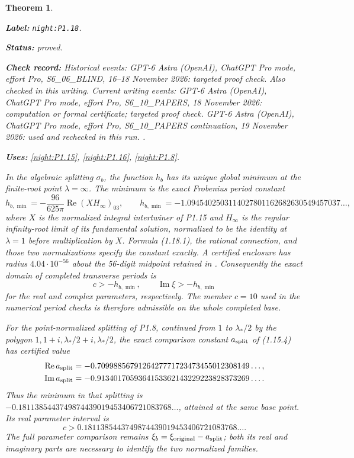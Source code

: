 \documentclass[11pt,a4paper]{article}
\newtheorem{theorem}{Theorem}[section]
\theoremstyle{definition}
\newcommand{\StatementRecord}[4]{\par\smallskip\begingroup\upshape\raggedright\noindent\textbf{Label:} \nolinkurl{#1}.\par\noindent\textbf{Status:} #2.\par\noindent\textbf{Check record:} #3.\par\noindent\textbf{Uses:} #4.\par\endgroup\smallskip}
\begin{document}
\begin{theorem}\label{night:P1.18}
\StatementRecord{night:P1.18}{proved}{Historical events: GPT-6 Astra (OpenAI), ChatGPT Pro mode, effort Pro, S6\_06\_BLIND, 16--18 November 2026: targeted proof check. Also checked in this writing. Current writing events: GPT-6 Astra (OpenAI), ChatGPT Pro mode, effort Pro, S6\_10\_PAPERS, 18 November 2026: computation or formal certificate; targeted proof check. GPT-6 Astra (OpenAI), ChatGPT Pro mode, effort Pro, S6\_10\_PAPERS continuation, 19 November 2026: used and rechecked in this run. }{\cref{night:P1.15}, \cref{night:P1.16}, \cref{night:P1.8}}
In the algebraic splitting $\sigma_b$, the function $h_b$ has its
unique global minimum at the finite-root point $\lambda=\infty$.
The minimum is the exact Frobenius period constant
\[
 h_{b,\min}=-\frac{96}{625\pi}\operatorname{Re}(XH_\infty)_{03},
 \qquad
 h_{b,\min}=-1.0945402503114027801162682630549457037\ldots,
\tag{1.18.1}
\]
where $X$ is the normalized integral intertwiner of P1.15 and
$H_\infty$ is the regular infinity-root limit of its fundamental
solution, normalized to be the identity at $\lambda=1$ before
multiplication by $X$.  Formula (1.18.1), the rational connection,
and those two normalizations specify the constant exactly.
A certified enclosure has radius $4.04\cdot10^{-56}$ about the
56-digit midpoint retained in
.
Consequently the exact domain of completed transverse periods is
\[
 c>-h_{b,\min},\qquad
 \operatorname{Im}\xi>-h_{b,\min}
\]
for the real and complex parameters, respectively.
The member $c=10$ used in the numerical period checks is therefore
admissible on the whole completed base.

For the point-normalized splitting of P1.8, continued from
$1$ to $\lambda_*/2$ by the polygon
$1,1+i,\lambda_*/2+i,\lambda_*/2$, the exact comparison constant
$a_{\rm split}$ of (1.15.4) has certified value
\[
\begin{split}
 \operatorname{Re}a_{\rm split}
   &=-0.7099885679126427771723473455012308149\ldots,\\
 \operatorname{Im}a_{\rm split}
   &=-0.9134017059364153362143229223828373269\ldots.
\end{split}
\]
Thus the minimum in that splitting is
$-0.1811385443749874439019453406721083768\ldots$,
attained at the same base point.  Its real parameter interval is
\[
 c>0.1811385443749874439019453406721083768\ldots.
\]
The full parameter comparison remains
$\xi_b=\xi_{\rm original}-a_{\rm split}$; both its real and imaginary
parts are necessary to identify the two normalized families.
\end{theorem}
\end{document}
